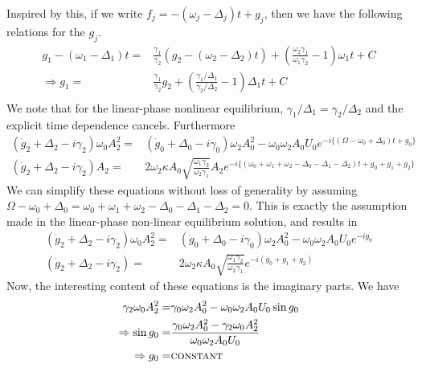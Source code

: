 Inspired by this, if we write $f_j = -(\omega_j - \Delta_j)t + g_j$, then we have the following relations for the $g_j$.
\begin{subequations}
\begin{align}
g_1 -(\omega_1 - \Delta_1)t = & \frac{\gamma_1}{\gamma_2}(g_2 - (\omega_2 - \Delta_2)t ) +\left(\frac{\omega_2\gamma_1}{\omega_1\gamma_2} -1\right)\omega_1 t + C \\
\Rightarrow g_1 = & \frac{\gamma_1}{\gamma_2} g_2 + \left(\frac{\gamma_1/\Delta_1}{\gamma_2/\Delta_2} - 1\right) \Delta_1 t + C \\
\end{align}
\end{subequations}
We note that for the linear-phase nonlinear equilibrium, $\gamma_1/\Delta_1 = \gamma_2/\Delta_2$ and the explicit time dependence cancels. Furthermore
\begin{subequations}
\begin{align}
(\dot{g}_2 + \Delta_2 -i\gamma_2)\omega_0 A_2^2 = & (\dot{g}_0 + \Delta_0 -i\gamma_0)\omega_2 A_0^2 - \omega_0\omega_2 A_0 U_0 e^{-i\{(\Omega - \omega_0 + \Delta_0)t + g_0\}} \\
(\dot{g}_2 + \Delta_2 -i\gamma_2) A_2 = & 2\omega_2 \kappa A_0 \sqrt{\frac{\omega_1\gamma_2}{\omega_2\gamma_1}} A_2 e^{-i\{(\omega_0 + \omega_1 + \omega_2 - \Delta_0 - \Delta_1 - \Delta_2)t + g_0 + g_1 + g_2\}}
\end{align}
\end{subequations}
We can simplify these equations without loss of generality by assuming $\Omega - \omega_0 + \Delta_0 = \omega_0 + \omega_1 + \omega_2 - \Delta_0 - \Delta_1 - \Delta_2 = 0$. This is exactly the assumption made in the linear-phase non-linear equilibrium solution, and results in
\begin{subequations}
\begin{align}
(\dot{g}_2 + \Delta_2 -i\gamma_2)\omega_0 A_2^2 = & (\dot{g}_0 + \Delta_0 -i\gamma_0)\omega_2 A_0^2 - \omega_0\omega_2 A_0 U_0 e^{-ig_0} \\
(\dot{g}_2 + \Delta_2 -i\gamma_2) = & 2\omega_2 \kappa A_0 \sqrt{\frac{\omega_1\gamma_2}{\omega_2\gamma_1}} e^{-i(g_0 + g_1 + g_2)}
\end{align}
\end{subequations}
Now, the interesting content of these equations is the imaginary parts. We have
\begin{subequations}
\begin{align}
\gamma_2 \omega_0 A_2^2 = & \gamma_0 \omega_2 A_0^2 - \omega_0\omega_2 A_0 U_0 \sin g_0 \\
\Rightarrow \sin g_0 = & \frac{\gamma_0 \omega_2 A_0^2 - \gamma_2 \omega_0 A_2^2}{\omega_0\omega_2 A_0 U_0} \\
\Rightarrow g_0 = & \textsc{constant}
\end{align}
\end{subequations}
